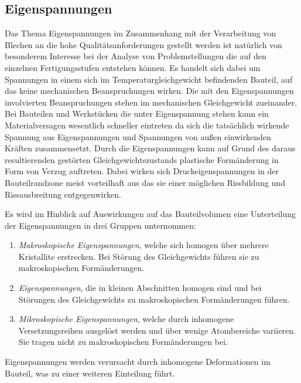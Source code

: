 \documentclass[12pt,a4paper,parskip]{scrartcl}
\begin{document}
\subsection{Eigenspannungen}
Das Thema Eigenspannungen im Zusammenhang mit der Verarbeitung von Blechen an die hohe Qualitätsanforderungen gestellt werden ist natürlich von besonderem Interesse bei der Analyse von Problemstellungen die auf den einzelnen Fertigungsstufen entstehen können. Es handelt sich dabei um Spannungen in einem sich im Temperaturgleichgewicht befindenden Bauteil, auf das keine mechanischen Beanspruchungen wirken. Die mit den Eigenspannungen involvierten  Beanspruchungen stehen im mechanischen Gleichgewicht zueinander. Bei Bauteilen und Werkstücken die unter Eigenspannung stehen kann ein Materialversagen wesentlich schneller eintreten da sich die tatsächlich wirkende Spannung aus Eigenspannungen und Spannungen von außen einwirkenden Kräften zusammensetzt. Durch die Eigenspannungen kann auf Grund des daraus resultierenden gestörten Gleichgewichtszustands plastische Formänderung in Form von Verzug auftreten.
Dabei wirken sich Druckeigenspannungen in der Bauteilrandzone meist vorteilhaft aus das sie einer möglichen Rissbildung und Rissausbreitung entgegenwirken.

Es wird im Hinblick auf Auswirkungen auf das Bauteilvolumen eine Unterteilung der Eigenspannungen in drei Gruppen unternommen:
\begin{enumerate}
\item \emph{Makroskopische Eigenspannungen}, welche sich homogen über mehrere Kristallite erstrecken. Bei Störung des Gleichgewichts führen sie zu makroskopischen Formänderungen.
\item \emph{Eigenspannungen}, die in kleinen Abschnitten homogen sind und bei Störungen des Gleichgewichts zu makroskopischen Formänderungen führen.
\item \emph{Mikroskopische Eigenspannungen}, welche durch inhomogene Versetzungsreihen ausgelöst werden und über wenige Atombereiche variieren. Sie tragen nicht zu makroskopischen Formänderungen bei. 


\end{enumerate}

Eigenspannungen werden verursacht durch inhomogene Deformationen im Bauteil, was zu einer weiteren Einteilung führt.
\end{document}
